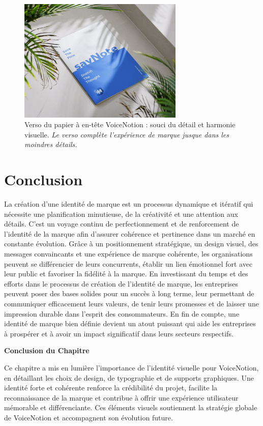 \begin{figure}[H]
    \centering
    \includegraphics[width=0.7\textwidth]{docs/visual-indentity/pictures/pappier-back.jpg}
    \caption{Verso du papier à en-tête VoiceNotion : souci du détail et harmonie visuelle. \newline\textit{Le verso complète l'expérience de marque jusque dans les moindres détails.}}
\end{figure}



\section{Conclusion}
La création d'une identité de marque est un processus dynamique et itératif qui nécessite une planification minutieuse, de la créativité et une attention aux détails. C'est un voyage continu de perfectionnement et de renforcement de l'identité de la marque afin d'assurer cohérence et pertinence dans un marché en constante évolution. Grâce à un positionnement stratégique, un design visuel, des messages convaincants et une expérience de marque cohérente, les organisations peuvent se différencier de leurs concurrents, établir un lien émotionnel fort avec leur public et favoriser la fidélité à la marque. En investissant du temps et des efforts dans le processus de création de l'identité de marque, les entreprises peuvent poser des bases solides pour un succès à long terme, leur permettant de communiquer efficacement leurs valeurs, de tenir leurs promesses et de laisser une impression durable dans l'esprit des consommateurs. En fin de compte, une identité de marque bien définie devient un atout puissant qui aide les entreprises à prospérer et à avoir un impact significatif dans leurs secteurs respectifs.

\vspace{1cm}
\begin{center}
\textbf{\large Conclusion du Chapitre}
\end{center}

\noindent
Ce chapitre a mis en lumière l'importance de l'identité visuelle pour VoiceNotion, en détaillant les choix de design, de typographie et de supports graphiques. Une identité forte et cohérente renforce la crédibilité du projet, facilite la reconnaissance de la marque et contribue à offrir une expérience utilisateur mémorable et différenciante. Ces éléments visuels soutiennent la stratégie globale de VoiceNotion et accompagnent son évolution future.
